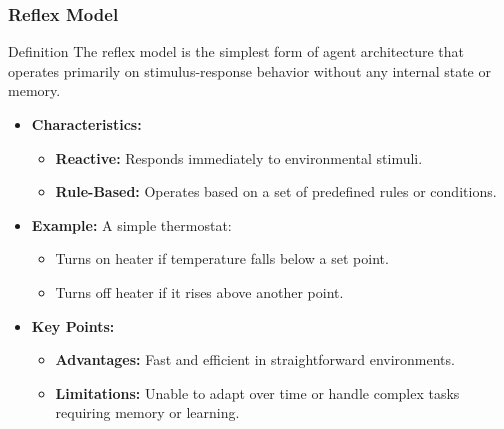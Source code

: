 \documentclass[aspectratio=169]{beamer}
\begin{document}
\begin{frame}[fragile]
    \frametitle{Reflex Model}
    \begin{block}{Definition}
        The reflex model is the simplest form of agent architecture that operates primarily on stimulus-response behavior without any internal state or memory.
    \end{block}
    \begin{itemize}
        \item \textbf{Characteristics:}
        \begin{itemize}
            \item \textbf{Reactive:} Responds immediately to environmental stimuli.
            \item \textbf{Rule-Based:} Operates based on a set of predefined rules or conditions.
        \end{itemize}

        \item \textbf{Example:} A simple thermostat:
        \begin{itemize}
            \item Turns on heater if temperature falls below a set point.
            \item Turns off heater if it rises above another point.
        \end{itemize}
        
        \item \textbf{Key Points:}
        \begin{itemize}
            \item \textbf{Advantages:} Fast and efficient in straightforward environments.
            \item \textbf{Limitations:} Unable to adapt over time or handle complex tasks requiring memory or learning.
        \end{itemize}
    \end{itemize}
\end{frame}
\end{document}
